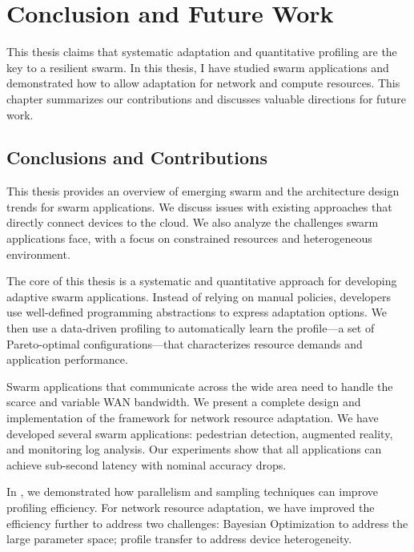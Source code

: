 \documentclass[thesis.tex]{subfiles}
\begin{document}
\chapter{Conclusion and Future Work}
\label{cha:concl-future-work}

This thesis claims that systematic adaptation and quantitative profiling are the
key to a resilient swarm. In this thesis, I have studied swarm applications and
demonstrated how to allow adaptation for network and compute resources. This
chapter summarizes our contributions and discusses valuable directions for
future work.

\section{Conclusions and Contributions}
\label{sec:contributions}

 This thesis provides an overview of
emerging swarm and the architecture design trends for swarm applications. We
discuss issues with existing approaches that directly connect devices to the
cloud. We also analyze the challenges swarm applications face, with a focus on
constrained resources and heterogeneous environment.

 The core of this thesis is a
systematic and quantitative approach for developing adaptive swarm
applications. Instead of relying on manual policies, developers use well-defined
programming abstractions to express adaptation options. We then use a
data-driven profiling to automatically learn the profile---a set of
Pareto-optimal configurations---that characterizes resource demands and
application performance.

 Swarm applications
that communicate across the wide area need to handle the scarce and variable WAN
bandwidth. We present a complete design and implementation of the framework
\awstream{} for network resource adaptation. We have developed several swarm
applications: pedestrian detection, augmented reality, and monitoring log
analysis. Our experiments show that all applications can achieve sub-second
latency with nominal accuracy drops.

 In \awstream{}, we demonstrated how
parallelism and sampling techniques can improve profiling efficiency. For
network resource adaptation, we have improved the efficiency further to address
two challenges: Bayesian Optimization to address the large parameter space;
profile transfer to address device heterogeneity.
\end{document}

